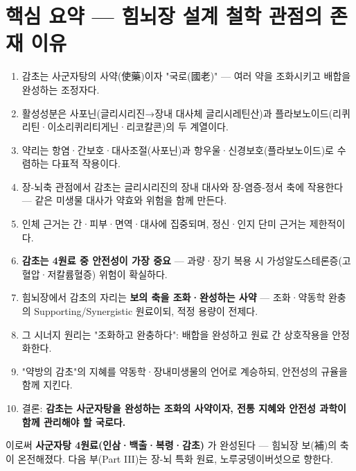 \documentclass[11pt,oneside]{book}
\begin{document}
\section{핵심 요약 — 힘뇌장 설계 철학 관점의 존재 이유}
\begin{enumerate}[leftmargin=6mm,itemsep=1pt,topsep=2pt]
  \item 감초는 사군자탕의 사약(使藥)이자 "국로(國老)" — 여러 약을 조화시키고 배합을 완성하는 조정자다.
  \item 활성성분은 사포닌(글리시리진→장내 대사체 글리시레틴산)과 플라보노이드(리퀴리틴·이소리퀴리티게닌·리코칼콘)의 두 계열이다.
  \item 약리는 항염·간보호·대사조절(사포닌)과 항우울·신경보호(플라보노이드)로 수렴하는 다표적 작용이다.
  \item 장-뇌축 관점에서 감초는 글리시리진의 장내 대사와 장-염증-정서 축에 작용한다 — 같은 미생물 대사가 약효와 위험을 함께 만든다.
  \item 인체 근거는 간·피부·면역·대사에 집중되며, 정신·인지 단미 근거는 제한적이다.
  \item \textbf{감초는 4원료 중 안전성이 가장 중요} — 과량·장기 복용 시 가성알도스테론증(고혈압·저칼륨혈증) 위험이 확실하다.
  \item 힘뇌장에서 감초의 자리는 \textbf{보의 축을 조화·완성하는 사약} — 조화·약동학 완충의 Supporting/Synergistic 원료이되, 적정 용량이 전제다.
  \item 그 시너지 원리는 "조화하고 완충하다": 배합을 완성하고 원료 간 상호작용을 안정화한다.
  \item "약방의 감초"의 지혜를 약동학·장내미생물의 언어로 계승하되, 안전성의 규율을 함께 지킨다.
  \item 결론: \textbf{감초는 사군자탕을 완성하는 조화의 사약이자, 전통 지혜와 안전성 과학이 함께 관리해야 할 국로다.}
\end{enumerate}
이로써 \textbf{사군자탕 4원료(인삼·백출·복령·감초)} 가 완성된다 — 힘뇌장 보(補)의 축이 온전해졌다. 다음 부(Part III)는 장-뇌 특화 원료, 노루궁뎅이버섯으로 향한다.
\end{document}
